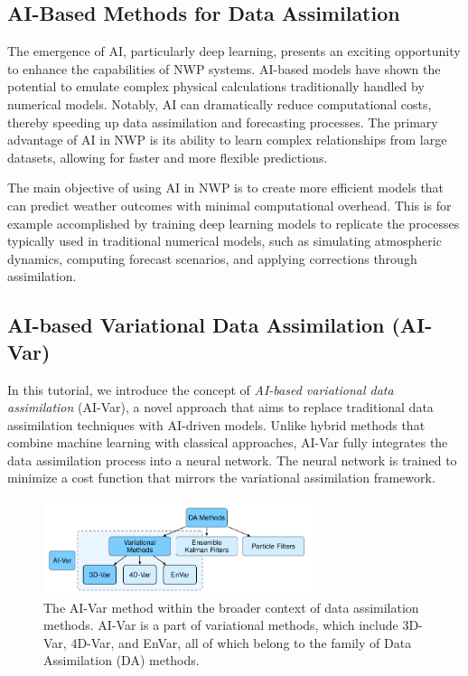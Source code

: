 %
\subsection{AI-Based Methods for Data Assimilation}

The emergence of AI, particularly deep learning, presents an exciting opportunity to enhance the capabilities of NWP systems. AI-based models have shown the potential to emulate complex physical calculations traditionally handled by numerical models. Notably, AI can dramatically reduce computational costs, thereby speeding up data assimilation and forecasting processes. The primary advantage of AI in NWP is its ability to learn complex relationships from large datasets, allowing for faster and more flexible predictions.

The main objective of using AI in NWP is to create more efficient models that can predict weather outcomes with minimal computational overhead. This is for example accomplished by training deep learning models to replicate the processes typically used in traditional numerical models, such as simulating atmospheric dynamics, computing forecast scenarios, and applying corrections through assimilation.

%
\subsection{AI-based Variational Data Assimilation (AI-Var)}

In this tutorial, we introduce the concept of \textit{AI-based variational data assimilation} (AI-Var), a novel approach that aims to replace traditional data assimilation techniques with AI-driven models. Unlike hybrid methods that combine machine learning with classical approaches, AI-Var fully integrates the data assimilation process into a neural network. The neural network is trained to minimize a cost function that mirrors the variational assimilation framework.

\begin{figure}[ht]
\centering
\includegraphics[width=0.7\textwidth]{images/aivar2.png}
\caption{The AI-Var method within the broader context of data assimilation methods. AI-Var is a part of variational methods, which include 3D-Var, 4D-Var, and EnVar, all of which belong to the family of Data Assimilation (DA) methods.}
\end{figure}

